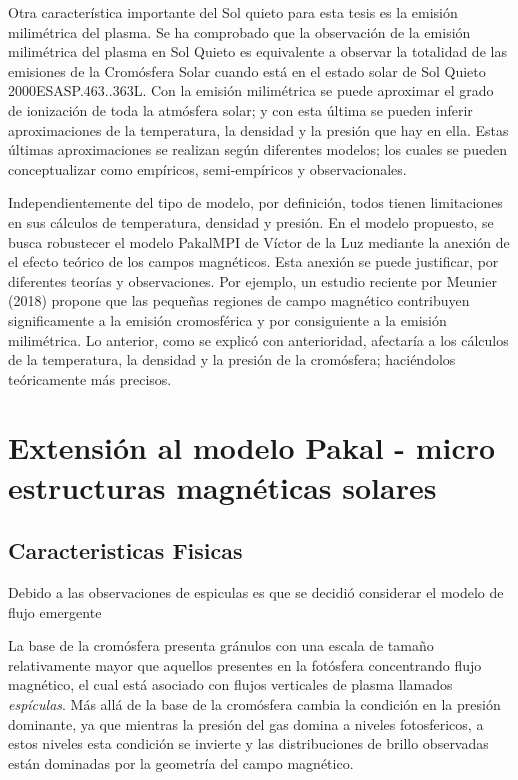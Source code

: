 \documentclass[9pt]{book}
\begin{document}
Otra caracter\'istica importante del Sol quieto para esta tesis es la emisi\'on milim\'etrica del plasma. Se ha comprobado que la observaci\'on de la emisi\'on milim\'etrica del plasma en Sol Quieto es equivalente a observar la totalidad de las emisiones de la Crom\'osfera Solar cuando est\'a en el estado solar de Sol Quieto 2000ESASP.463..363L. Con la emisi\'on milim\'etrica se puede aproximar el grado de ionizaci\'on de toda la atm\'osfera solar; y con esta \'ultima se pueden inferir aproximaciones de la temperatura, la densidad y la presi\'on que hay en ella. Estas \'ultimas aproximaciones se realizan seg\'un diferentes modelos; los cuales se pueden conceptualizar como emp\'iricos, semi-emp\'iricos y observacionales. 

Independientemente del tipo de modelo, por definici\'on, todos tienen limitaciones en sus c\'alculos de temperatura, densidad y presi\'on. En el modelo propuesto, se busca robustecer el modelo PakalMPI de V\'ictor de la Luz mediante la anexi\'on de el efecto te\'orico de los campos magn\'eticos. Esta anexi\'on se puede justificar, por diferentes teor\'ias y observaciones. Por ejemplo, un estudio reciente por Meunier (2018) propone que las peque\~nas regiones de campo magn\'etico contribuyen significamente a la emisi\'on cromosf\'erica y por consiguiente a la emisi\'on milim\'etrica. Lo anterior, como se explic\'o con anterioridad, afectar\'ia a los c\'alculos de la temperatura, la densidad y la presi\'on de la crom\'osfera; haci\'endolos te\'oricamente m\'as precisos.

  
\chapter{Extensi\'on al modelo Pakal - micro estructuras magn\'eticas solares}

                                                                                       

\section{Caracteristicas Fisicas}

Debido a las observaciones de espiculas es que se decidi\'o considerar el modelo de flujo emergente

La base de la crom\'osfera presenta gr\'anulos con una escala de tama\~no relativamente mayor que aquellos presentes en la fot\'osfera concentrando flujo magn\'etico, el cual est\'a asociado con flujos verticales de plasma llamados \emph{esp\'iculas}. M\'as all\'a de la base de la crom\'osfera cambia la condici\'on en la presi\'on dominante, ya que mientras la presi\'on del gas domina a niveles fotosfericos, a estos niveles esta condici\'on se invierte y las distribuciones de brillo observadas est\'an dominadas por la geometr\'ia del campo magn\'etico.
\end{document}
